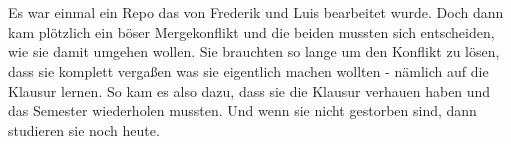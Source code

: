 


\chapter{\chapterTwo}
Es war einmal ein Repo das von Frederik und Luis bearbeitet wurde.
Doch dann kam plötzlich ein böser Mergekonflikt und die beiden mussten sich entscheiden, wie sie damit umgehen wollen.
Sie brauchten so lange um den Konflikt zu lösen, dass sie komplett vergaßen was sie eigentlich machen wollten - nämlich auf die Klausur lernen.
So kam es also dazu, dass sie die Klausur verhauen haben und das Semester wiederholen mussten.
Und wenn sie nicht gestorben sind, dann studieren sie noch heute.

